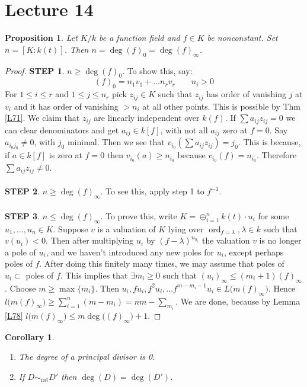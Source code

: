 \documentclass{article}
\DeclareMathOperator{\ord}{ord}
\theoremstyle{plain}
\newtheorem{cor}[thm]{Corollary}
\newtheorem{prop}[thm]{Proposition}
\theoremstyle{definition}
\theoremstyle{remark}
\begin{document}
\section*{Lecture 14}
\begin{prop}
\label{L80}
Let $K/k$ be a function field and $f\in K$ be nonconstant. Set $n = [K:k(t)]$. Then $n = \deg(f)_0 = \deg(f)_{\infty}$.
\end{prop}
\begin{proof}
\textbf{STEP 1}. $n\geq \deg(f)_0$. To show this, say:
\[       (f)_0 = n_1v_1 + \dots n_r v_r \;\;\;\;\;\;\; n_i>0      \]
For $1\leq i \leq r$ and $1\leq j \leq n_r$ pick $z_{ij} \in K$ such that $z_{ij}$ has order of vanishing $j$ at $v_i$ and it has order of vanishing $>n_i$ at all other points. This is possible by Thm \ref{L71}. We claim that $z_{ij}$ are linearly independent over $k(f)$. If $\sum a_{ij} z_{ij} = 0$ we can clear denominators and get $a_{ij} \in k[f]$, with not all $a_{ij}$ zero at $f=0$. Say $a_{i_0j_0} \neq 0$, with $j_0$ minimal. Then we see that $v_{i_0}(\sum a_{ij}z_{ij}) = j_0$. This is because, if $a\in k[f]$ is zero at $f=0$ then $v_{i_0}(a)\geq n_{i_0}$ because $v_{i_0}(f) = n_{i_0}$. Therefore $\sum a_{ij} z_{ij} \neq 0$.
\\
\\
\textbf{STEP 2}. $n\geq \deg(f)_{\infty}$. To see this, apply step 1 to $f^{-1}$.
\\
\\
\textbf{STEP 3}. $n\leq \deg(f)_{\infty}$. To prove this, write $K = \oplus_{i=1}^n k(t) \cdot u_i$ for some $u_1, \dots, u_n \in K$. Suppose $v$ is a valuation of $K$ lying over $\ord_{f=\lambda} , \lambda \in k$ such that $v(u_i)<0$. Then after multiplying $u_i$ by $(f-\lambda)^{n_{u_i}}$ the valuation $v$ is no longer a pole of $u_i$, and we haven't introduced any new poles for $u_i$, except perhaps poles of $f$. After doing this finitely many times, we may assume that poles of $u_i \subset$ poles of $f$. This implies that $\exists m_i\geq 0$ such that $(u_i)_\infty \leq (m_i + 1)(f)_{\infty}$. Choose $m\geq \max \{m_i\}$. Then $u_i, fu_i, f^2u_i, \dots f^{m-m_i -1}u_i \in L\big(m(f)_{\infty}\big)$. Hence $l\big(  m(f)_{\infty} \big) \geq \sum_{i=1}^n (m-m_i) = nm - \sum_{m_i}$. We are done, because by Lemma \ref{L78} $l\big(  m(f)_{\infty} \big) \leq m \deg\big((f)_{\infty}) +1$.
\end{proof}

\begin{cor}
\hspace{1mm}
\label{L81} 
\begin{enumerate}
\item The degree of a principal divisor is 0.
\item If $D\sim_{\text{rat}} D'$ then $\deg(D) = \deg(D')$.
\end{enumerate}
\end{cor}
\end{document}
